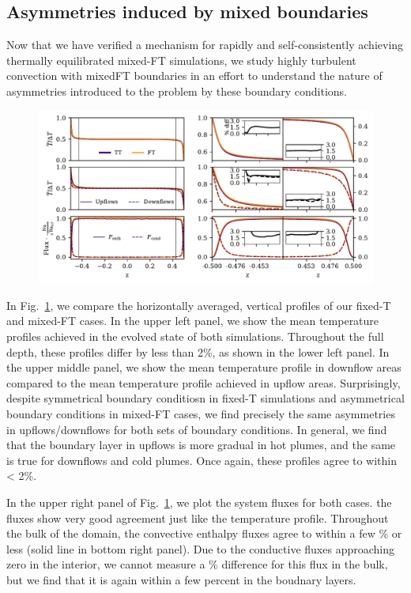\documentclass[aps, pre, onecolumn, nofootinbib, notitlepage, groupedaddress, amsfonts, amssymb, amsmath, longbibliography]{revtex4-1}
\begin{document}
\subsection{Asymmetries induced by mixed boundaries}
\label{sec:asymmetries}
Now that we have verified a mechanism for rapidly and self-consistently achieving thermally equilibrated mixed-FT simulations, we study highly turbulent convection with mixedFT boundaries in an effort to understand the nature of asymmetries introduced to the problem by these boundary conditions.


\begin{figure}
\includegraphics[width=\textwidth]{./figs/rbc_1D_profiles.pdf}
\caption{ 
\label{fig:rbc_1D_profiles} }
\end{figure}

In Fig.~\ref{fig:rbc_1D_profiles}, we compare the horizontally averaged, vertical profiles of our fixed-T and mixed-FT cases.
In the upper left panel, we show the mean temperature profiles achieved in the evolved state of both simulations.
Throughout the full depth, these profiles differ by less than 2\%, as shown in the lower left panel.
In the upper middle panel, we show the mean temperature profile in downflow areas compared to the mean temperature profile achieved in upflow areas.
Surprisingly, despite symmetrical boundary conditiosn in fixed-T simulations and asymmetrical boundary conditions in mixed-FT cases, we find precisely the same asymmetries in upflows/downflows for both sets of boundary conditions.
In general, we find that the boundary layer in upflows is more gradual in hot plumes, and the same is true for downflows and cold plumes.
Once again, these profiles agree to within < 2\%.

In the upper right panel of Fig.~\ref{fig:rbc_1D_profiles}, we plot the system fluxes for both cases.
the fluxes show very good agreement just like the temperature profile.
Throughout the bulk of the domain, the convective enthalpy fluxes agree to within a few \% or less (solid line in bottom right panel).
Due to the conductive fluxes approaching zero in the interior, we cannot measure a \% difference for this flux in the bulk, but we find that it is again within a few percent in the boudnary layers.
\end{document}
